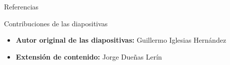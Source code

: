 
\begin{frame}[allowframebreaks]{Referencias}
    
    
\end{frame}

\begin{frame}{Contribuciones de las diapositivas}
\begin{itemize}
    \item \textbf{Autor original de las diapositivas:} Guillermo Iglesias Hernández
    \item \textbf{Extensión de contenido:} Jorge Dueñas Lerín
\end{itemize}
\end{frame}

